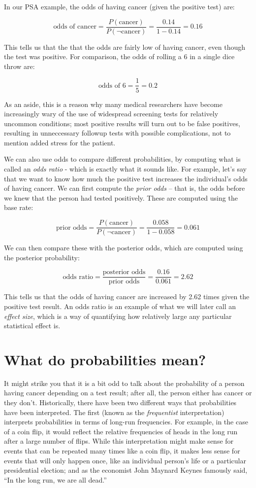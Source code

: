 \documentclass[12pt,]{book}
\theoremstyle{definition}
\theoremstyle{definition}
\theoremstyle{definition}
\theoremstyle{remark}
\begin{document}
In our PSA example, the odds of having cancer (given the positive test) are:

\[
\text{odds of cancer} = \frac{P(\text{cancer})}{P(\neg \text{cancer})} =\frac{0.14}{1 - 0.14} = 0.16
\]

This tells us that the that the odds are fairly low of having cancer, even though the test was positive. For comparison, the odds of rolling a 6 in a single dice throw are:

\[
\text{odds of 6} = \frac{1}{5} = 0.2
\]

As an aside, this is a reason why many medical researchers have become increasingly wary of the use of widespread screening tests for relatively uncommon conditions; most positive results will turn out to be false positives, resulting in unneccessary followup tests with possible complications, not to mention added stress for the patient.

We can also use odds to compare different probabilities, by computing what is called an \emph{odds ratio} - which is exactly what it sounds like. For example, let's say that we want to know how much the positive test increases the individual's odds of having cancer. We can first compute the \emph{prior odds} -- that is, the odds before we knew that the person had tested positively. These are computed using the base rate:

\[
\text{prior odds} = \frac{P(\text{cancer})}{P(\neg \text{cancer})} =\frac{0.058}{1 - 0.058} = 0.061
\]

We can then compare these with the posterior odds, which are computed using the posterior probability:

\[
\text{odds ratio} = \frac{\text{posterior odds}}{\text{prior odds}} = \frac{0.16}{0.061} = 2.62
\]

This tells us that the odds of having cancer are increased by 2.62 times given the positive test result. An odds ratio is an example of what we will later call an \emph{effect size}, which is a way of quantifying how relatively large any particular statistical effect is.

\hypertarget{what-do-probabilities-mean}{%
\section{What do probabilities mean?}\label{what-do-probabilities-mean}}

It might strike you that it is a bit odd to talk about the probability of a person having cancer depending on a test result; after all, the person either has cancer or they don't. Historically, there have been two different ways that probabilities have been interpreted. The first (known as the \emph{frequentist} interpretation) interprets probabilities in terms of long-run frequencies. For example, in the case of a coin flip, it would reflect the relative frequencies of heads in the long run after a large number of flips. While this interpretation might make sense for events that can be repeated many times like a coin flip, it makes less sense for events that will only happen once, like an individual person's life or a particular presidential election; and as the economist John Maynard Keynes famously said, ``In the long run, we are all dead.''
\end{document}
